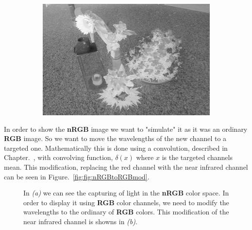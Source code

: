 \begin{figure}[H]
\begin{subfigure}[b]{0.49\textwidth}
		\caption{}
		\label{fig:rgbVSnrgbMSAVI}
    \end{subfigure}
    \begin{subfigure}[b]{0.49\textwidth}
        \centering
        \includegraphics[width=\textwidth]{./figure/appendix/color_rep/images/msavi2.jpg}
		\caption{}
		\label{fig:rgbVSnrgbMSAVI2}
    \end{subfigure}
    \caption{}
    \label{fig:rgbVSnrgb}
\end{figure}

In order to show the \textbf{nRGB} image we want to "simulate" it as it was an ordinary \textbf{RGB} image. So we want to move the wavelengths of the new channel to a targeted one. Mathematically this is done using a convolution, described in Chapter.~\label{chap:conv}, with convolving function, $\delta(x)$ where $x$ is the targeted channels mean. This modification, replacing the red channel with the near infrared channel can be seen in Figure.~\ref{fig:fig:nRGBtoRGBmod}.

\begin{figure}[H]
    \centering
    \captionsetup[subfigure]{justification=centering}
    \begin{subfigure}[b]{0.49\textwidth}
        \centering
        \resizebox{\textwidth}{!}{
            
        }
		\caption{}
    \end{subfigure}
    \begin{subfigure}[b]{0.49\textwidth}
        \centering
        \resizebox{\textwidth}{!}{
            
        }
		\caption{}
    \end{subfigure}
    \caption{In \textit{(a)} we can see the capturing of light in the \textbf{nRGB} color space. In order to display it using \textbf{RGB} color channels, we need to modify the wavelengths to the ordinary of \textbf{RGB} colors. This modification of the near infrared channel is showns in \textit{(b)}.}
    \label{fig:nRGBtoRGBmod}
\end{figure}

